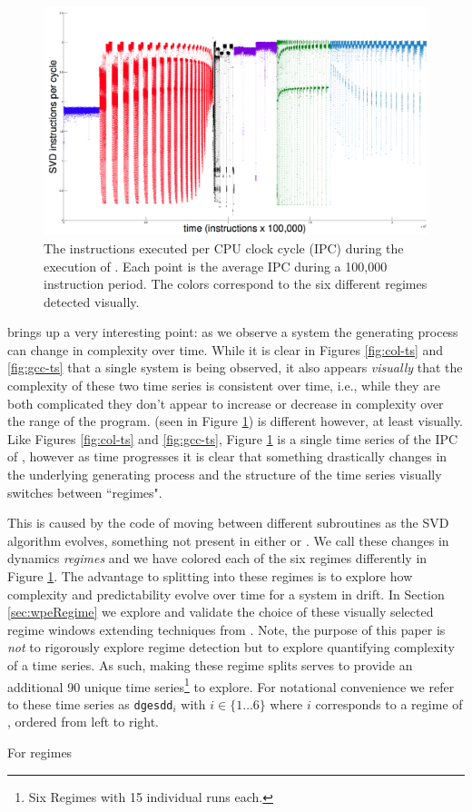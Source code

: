 \begin{figure}[t]
    \centering
    \includegraphics[width=\columnwidth]{figs/SVD1RegimesColored}
    \caption{The instructions executed per CPU clock cycle (IPC) during the execution of \svd. Each point is the average IPC during a 100,000 instruction period. The colors correspond to the six different regimes detected visually.}
    \label{fig:svd-ts-colored}
  \end{figure}

\svd brings up a very interesting point: as we observe a system the generating process can change in complexity over time. While it is clear in Figures \ref{fig:col-ts} and \ref{fig:gcc-ts} that a single system is being observed, it also appears \emph{visually} that the complexity of these two time series is consistent over time, i.e., while they are both complicated they don't appear to increase or decrease in complexity over the range of the program. \svd (seen in Figure \ref{fig:svd-ts-colored}) is different however, at least visually. Like Figures \ref{fig:col-ts} and \ref{fig:gcc-ts}, Figure \ref{fig:svd-ts-colored} is a single time series of the IPC of \svd, however as time progresses it is clear that something drastically changes in the underlying generating process and the structure of the time series  visually switches between ``regimes".

This is caused by the code of \svd moving between different subroutines as the SVD algorithm evolves, something not present in either \gcc or \col. We call these changes in \svd dynamics \emph{\svd regimes} and we have colored each of the six regimes differently in Figure \ref{fig:svd-ts-colored}. The advantage to splitting \svd into these regimes is to explore how complexity and predictability evolve over time for a system in drift. In Section \ref{sec:wpeRegime} we explore and validate the choice of these visually selected regime windows extending techniques from \cite{cao2004det}. Note, the purpose of this paper is \emph{not} to rigorously explore regime detection but to explore quantifying complexity of a time series. As such, making these regime splits serves to provide an additional 90 unique time series\footnote{Six Regimes with 15 individual runs each.} to explore. For notational convenience we refer to these time series as {\tt dgesdd$_i$} with $i \in \{1\dots6\}$ where $i$ corresponds to a regime of \svd, ordered from left to right.


For regimes \cite{cao2004det}
